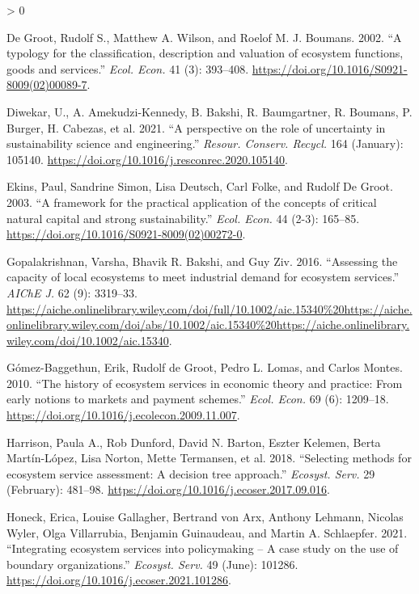 \documentclass[
  14pt,
]{extarticle}
\newlength{\cslhangindent}
\newenvironment{CSLReferences}[2] %
 {%
  \setlength{\parindent}{0pt}
  \ifodd #1 \everypar{\setlength{\hangindent}{\cslhangindent}}\ignorespaces\fi
  \ifnum #2 > 0
  \setlength{\parskip}{#2\baselineskip}
  \fi
 }%
 {}
\begin{document}
\begin{CSLReferences}{1}{0}
\leavevmode\hypertarget{ref-DeGroot2002}{}%
De Groot, Rudolf S., Matthew A. Wilson, and Roelof M. J. Boumans. 2002. {``{A typology for the classification, description and valuation of ecosystem functions, goods and services}.''} \emph{Ecol. Econ.} 41 (3): 393--408. \url{https://doi.org/10.1016/S0921-8009(02)00089-7}.

\leavevmode\hypertarget{ref-Diwekar2021}{}%
Diwekar, U., A. Amekudzi-Kennedy, B. Bakshi, R. Baumgartner, R. Boumans, P. Burger, H. Cabezas, et al. 2021. {``{A perspective on the role of uncertainty in sustainability science and engineering}.''} \emph{Resour. Conserv. Recycl.} 164 (January): 105140. \url{https://doi.org/10.1016/j.resconrec.2020.105140}.

\leavevmode\hypertarget{ref-Ekins2003}{}%
Ekins, Paul, Sandrine Simon, Lisa Deutsch, Carl Folke, and Rudolf De Groot. 2003. {``{A framework for the practical application of the concepts of critical natural capital and strong sustainability}.''} \emph{Ecol. Econ.} 44 (2-3): 165--85. \url{https://doi.org/10.1016/S0921-8009(02)00272-0}.

\leavevmode\hypertarget{ref-Gopalakrishnan2016}{}%
Gopalakrishnan, Varsha, Bhavik R. Bakshi, and Guy Ziv. 2016. {``{Assessing the capacity of local ecosystems to meet industrial demand for ecosystem services}.''} \emph{AIChE J.} 62 (9): 3319--33. \url{https://aiche.onlinelibrary.wiley.com/doi/full/10.1002/aic.15340\%20https://aiche.onlinelibrary.wiley.com/doi/abs/10.1002/aic.15340\%20https://aiche.onlinelibrary.wiley.com/doi/10.1002/aic.15340}.

\leavevmode\hypertarget{ref-Gomez-Baggethun2010}{}%
Gómez-Baggethun, Erik, Rudolf de Groot, Pedro L. Lomas, and Carlos Montes. 2010. {``{The history of ecosystem services in economic theory and practice: From early notions to markets and payment schemes}.''} \emph{Ecol. Econ.} 69 (6): 1209--18. \url{https://doi.org/10.1016/j.ecolecon.2009.11.007}.

\leavevmode\hypertarget{ref-Harrison2018}{}%
Harrison, Paula A., Rob Dunford, David N. Barton, Eszter Kelemen, Berta Martín-López, Lisa Norton, Mette Termansen, et al. 2018. {``{Selecting methods for ecosystem service assessment: A decision tree approach}.''} \emph{Ecosyst. Serv.} 29 (February): 481--98. \url{https://doi.org/10.1016/j.ecoser.2017.09.016}.

\leavevmode\hypertarget{ref-Honeck2021}{}%
Honeck, Erica, Louise Gallagher, Bertrand von Arx, Anthony Lehmann, Nicolas Wyler, Olga Villarrubia, Benjamin Guinaudeau, and Martin A. Schlaepfer. 2021. {``{Integrating ecosystem services into policymaking -- A case study on the use of boundary organizations}.''} \emph{Ecosyst. Serv.} 49 (June): 101286. \url{https://doi.org/10.1016/j.ecoser.2021.101286}.


\end{CSLReferences}
\end{document}
